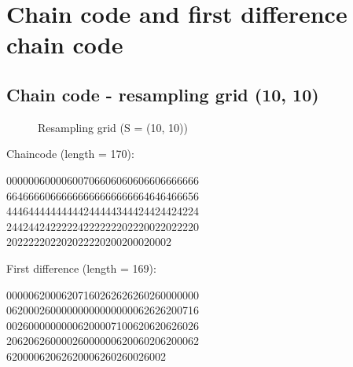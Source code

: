 \pagebreak
\section{Chain code and first difference chain code}

\subsection{Chain code - resampling grid (10, 10)}

\begin{figure}[!htb]\centering
    \caption{\small{Resampling grid (S = (10, 10))}}
\end{figure}
Chaincode (length = 170):
\begin{center}
00000060000600706606060606606666666\\
66466660666666666666666664646466656\\
44464444444444244444344424424424224\\
24424424222224222222202220022022220\\
202222202202022220200200020002
\end{center}

\bigskip

First difference (length = 169):
\begin{center}
00000620006207160262626260260000000\\
06200026000000000000000062626200716\\
00260000000006200007100620620626026\\
20620626000026000000620060206200062\\
62000062062620006260260026002
\end{center}

